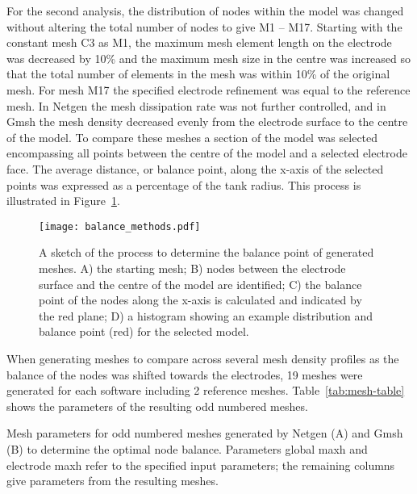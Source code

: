 \documentclass[12pt]{iopart}
\newcommand{\COMMENT}[1]{ \textsf{\color{blue}{{COMMENT: #1}}} }
\begin{document}
For the second analysis, the distribution of nodes within the 
model was changed without altering 
the total number of nodes to give M1 -- M17. 
Starting with the constant mesh C3 as M1, the maximum mesh element 
length on the electrode was decreased by 10\% and the maximum mesh size in the centre was
increased so that the total number of elements in the mesh was  within 10\% of the 
original mesh. For mesh M17 the specified electrode refinement was equal to the reference mesh. 
In Netgen the mesh dissipation rate was not further controlled, and in Gmsh the mesh density 
decreased evenly from the electrode surface to the centre of the model. 
To compare these meshes a section of the model was selected
encompassing all points between the centre of the model and a selected electrode face.
The average 
distance, or balance point, along the x-axis of the selected points was expressed 
as a percentage of the tank radius.
This process is illustrated in Figure~\ref{fig:balanceMethods}.
 
\begin{figure}
  \texttt{[image: balance\_methods.pdf]}
  \caption{\label{fig:balanceMethods} A sketch of the process to determine the 
  balance point of generated meshes. A) the starting mesh; B) nodes between the
  electrode surface and the centre of the model are identified; C) the 
  balance point of the nodes along the x-axis is calculated and indicated 
  by the red plane; D) a histogram showing an example distribution and balance point (red)
  for the selected model.}
\end{figure}

When generating meshes to compare across several mesh density profiles as the balance of the nodes was shifted 
towards the electrodes, 19 meshes were generated for each software including 2 reference meshes. 
Table~\ref{tab:mesh-table} shows the parameters of the resulting odd numbered meshes. 

\begin{table}[]
\caption{\label{tab:mesh-table}Mesh parameters for odd numbered meshes generated by Netgen (A) and Gmsh (B) 
to determine the optimal 
node balance. Parameters global maxh and electrode maxh refer to the specified input parameters; the remaining 
columns give parameters from the resulting meshes.}

\end{table}

%
%
%
\end{document}

